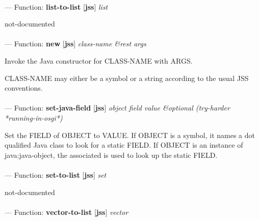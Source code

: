 \paragraph{}
\label{JSS:LIST-TO-LIST}
--- Function: \textbf{list-to-list} [\textbf{jss}] \textit{list}

\begin{adjustwidth}{5em}{5em}
not-documented
\end{adjustwidth}

\paragraph{}
\label{JSS:NEW}
--- Function: \textbf{new} [\textbf{jss}] \textit{class-name \&rest args}

\begin{adjustwidth}{5em}{5em}
Invoke the Java constructor for CLASS-NAME with ARGS.

CLASS-NAME may either be a symbol or a string according to the usual JSS conventions.
\end{adjustwidth}

\paragraph{}
\label{JSS:SET-JAVA-FIELD}
--- Function: \textbf{set-java-field} [\textbf{jss}] \textit{object field value \&optional (try-harder *running-in-osgi*)}

\begin{adjustwidth}{5em}{5em}
Set the FIELD of OBJECT to VALUE.
If OBJECT is a symbol, it names a dot qualified Java class to look for
a static FIELD.  If OBJECT is an instance of java:java-object, the
associated is used to look up the static FIELD.
\end{adjustwidth}

\paragraph{}
\label{JSS:SET-TO-LIST}
--- Function: \textbf{set-to-list} [\textbf{jss}] \textit{set}

\begin{adjustwidth}{5em}{5em}
not-documented
\end{adjustwidth}

\paragraph{}
\label{JSS:VECTOR-TO-LIST}
--- Function: \textbf{vector-to-list} [\textbf{jss}] \textit{vector}

